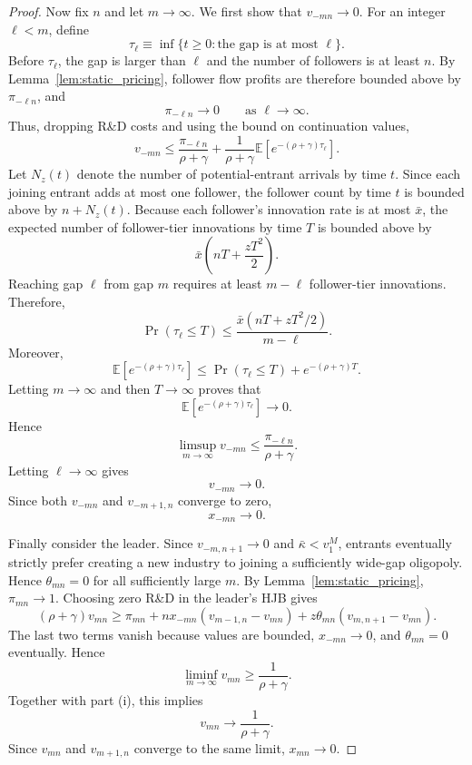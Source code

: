\documentclass[12pt]{article}
\begin{document}
\begin{proof}
Now fix \(n\) and let \(m\to\infty\). We first show that \(v_{-mn}\to 0\). For an integer \(\ell<m\), define
\[\tau_\ell\equiv \inf\{t\geq 0:\text{the gap is at most }\ell\}.\]
Before \(\tau_\ell\), the gap is larger than \(\ell\) and the number of followers is at least \(n\). By Lemma~\ref{lem:static_pricing}, follower flow profits are therefore bounded above by \(\pi_{-\ell n}\), and
\[\pi_{-\ell n}\to 0\qquad\text{as }\ell\to\infty.\]
Thus, dropping R\&D costs and using the bound on continuation values,
\[v_{-mn}\leq\frac{\pi_{-\ell n}}{\rho+\gamma}+\frac{1}{\rho+\gamma}\mathbb E\!\left[e^{-(\rho+\gamma)\tau_\ell}\right].\]
Let \(N_z(t)\) denote the number of potential-entrant arrivals by time \(t\). Since each joining entrant adds at most one follower, the follower count by time \(t\) is bounded above by \(n+N_z(t)\). Because each follower's innovation rate is at most \(\bar x\), the expected number of follower-tier innovations by time \(T\) is bounded above by
\[\bar x\left(nT+\frac{zT^2}{2}\right).\]
Reaching gap \(\ell\) from gap \(m\) requires at least \(m-\ell\) follower-tier innovations. Therefore,
\[\Pr(\tau_\ell\leq T)\leq\frac{\bar x\left(nT+zT^2/2\right)}{m-\ell}.\]
Moreover,
\[\mathbb E\!\left[e^{-(\rho+\gamma)\tau_\ell}\right]
\leq\Pr(\tau_\ell\leq T)+e^{-(\rho+\gamma)T}.\]
Letting \(m\to\infty\) and then \(T\to\infty\) proves that
\[\mathbb E\!\left[e^{-(\rho+\gamma)\tau_\ell}\right]\to0.\]
Hence
\[\limsup_{m\to\infty}v_{-mn}
\leq
\frac{\pi_{-\ell n}}{\rho+\gamma}.
\]
Letting \(\ell\to\infty\) gives
\[
v_{-mn}\to 0.
\]
Since both \(v_{-mn}\) and \(v_{-m+1,n}\) converge to zero,
\[
x_{-mn}\to 0.
\]

Finally consider the leader. Since \(v_{-m,n+1}\to 0\) and
\(\bar{\kappa}<v^M_1\), entrants eventually strictly prefer creating a new industry to
joining a sufficiently wide-gap oligopoly. Hence \(\theta_{mn}=0\) for all sufficiently large
\(m\). By Lemma~\ref{lem:static_pricing}, \(\pi_{mn}\to 1\). Choosing zero R\&D in the leader's HJB gives
\[
(\rho+\gamma)v_{mn} \geq \pi_{mn} + nx_{-mn}(v_{m-1,n}-v_{mn}) + z\theta_{mn}(v_{m,n+1}-v_{mn}).
\]
The last two terms vanish because values are bounded, \(x_{-mn}\to 0\), and \(\theta_{mn}=0\)
eventually. Hence
\[
\liminf_{m\to\infty}v_{mn}\geq \frac{1}{\rho+\gamma}.
\]
Together with part (i), this implies
\[
v_{mn}\to \frac{1}{\rho+\gamma}.
\]
Since \(v_{mn}\) and \(v_{m+1,n}\) converge to the same limit, \(x_{mn}\to 0\).

\medskip


\end{proof}
\end{document}

